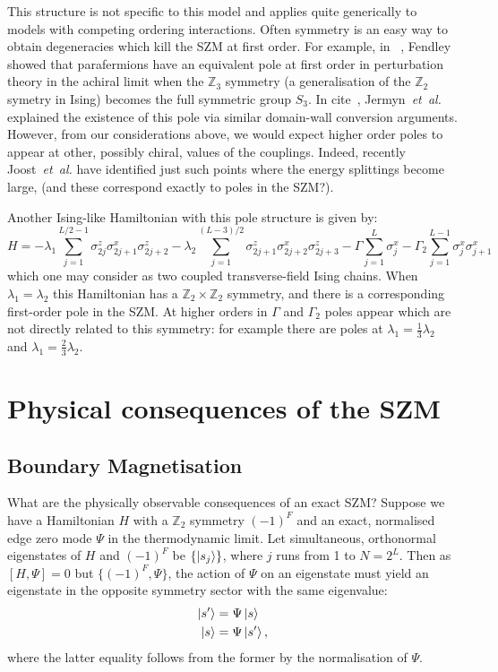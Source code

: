 \documentclass [a4paper, 11pt]{article}
\begin{document}
This structure is not specific to this model and applies quite generically to models with competing ordering interactions. Often symmetry is an easy way to obtain degeneracies which kill the SZM at first order. For example, in~
\cite{parafermions}, Fendley showed that parafermions have an equivalent pole at first order in perturbation theory in the achiral limit when the $\mathbb{Z}_3$ symmetry (a generalisation of the $\mathbb{Z}_2$ symetry in Ising) becomes the full symmetric group $S_3$. In cite~\cite{jermyn}, Jermyn~\textit{et~al.} explained the existence of this pole via similar domain-wall conversion arguments. However, from our considerations above, we would expect higher order poles to appear at other, possibly chiral, values of the couplings. Indeed, recently Joost~\textit{et~al.} have identified just such points where the energy splittings become large, (and these correspond exactly to poles in the SZM?).

Another Ising-like Hamiltonian with this pole structure is given by:
\begin{equation}
  \label{eq:chrisH}
 H =-\lambda_1\sum_{j=1}^{L/2-1}\sigma^z_{2 j} \sigma^x_{2j + 1}  \sigma^z_{2j+2} -\lambda_2\sum_{j=1}^{(L-3)/2}\sigma^z_{2j+1} \sigma^x_{2j+2}  \sigma^z_{2j+3} - \Gamma \sum_{j=1}^L \sigma^x_j - \Gamma_2 \sum_{j=1}^{L-1} \sigma^x_j \sigma^x_{j+1}
\end{equation}
which one may consider as two coupled transverse-field Ising chains. When $\lambda_1 = \lambda_2$ this Hamiltonian has a $\mathbb{Z}_2 \times \mathbb{Z}_2$ symmetry, and there is a corresponding first-order pole in the SZM. At higher orders in $\Gamma$ and $\Gamma_2$ poles appear which are not directly related to this symmetry: for example there are poles at $\lambda_1 = \frac{1}{3} \lambda_2$ and $\lambda_1 = \frac{2}{3} \lambda_2$.

\section{Physical consequences of the SZM}
\subsection{Boundary Magnetisation}
\label{sec:isingbm}
What are the physically observable consequences of an exact SZM? Suppose we have a Hamiltonian $H$ with a $\mathbb{Z}_2$ symmetry $(-1)^F$ and an exact, normalised edge zero mode $\Psi$ in the thermodynamic limit. Let simultaneous, orthonormal eigenstates of $H$ and $(-1)^F$ be $\{\ket{s_j}\}$, where $j$ runs from 1 to $N=2^L$. Then as $[H, \Psi] = 0$ but $\{(-1)^F, \Psi\}$, the action of $\Psi$ on an eigenstate must yield an eigenstate in the opposite symmetry sector with the same eigenvalue:
\begin{align}\label{eq:pairing}
  \ket{s^\prime} &=\Psi \ket{s} \\
  \ket{s} &=\Psi \ket{s^\prime},
\end{align}
where the latter equality follows from the former by the normalisation of $\Psi$.
\end{document}
